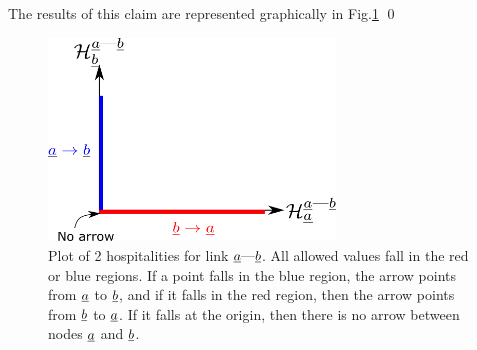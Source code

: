 \documentclass[12pt]{article}
\newcommand{\linkab }[0]{{\rva\text{---}\rvb}}
\begin{document}
The results of this claim
are represented graphically in 
Fig.\ref{fig-hospitalities-x-y}
\qed
\begin{figure}[h!]
\centering
\includegraphics[width=3in]
{hospitalities-x-y.png}
\caption{Plot of 2 hospitalities 
for link $\linkab$.
All allowed values 
fall in the
red or blue regions.
If a point falls in
the blue region, the arrow 
points from ${\underline{a}}$ to ${\underline{b}}$,
and if it falls in the red region,
then
the arrow points from ${\underline{b}}$ to ${\underline{a}}$.
If it falls at the origin, then
there is no arrow between 
nodes ${\underline{a}}$ and ${\underline{b}}$. }
\label{fig-hospitalities-x-y}
\end{figure}




\end{document}
